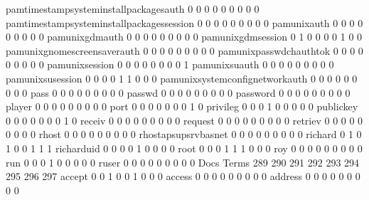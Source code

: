 \documentclass[compress,8pt]{beamer}
\begin{document}
\begin{frame}
\begin{Schunk}
  pamtimestampsysteminstallpackagesauth      0   0   0   0   0   0   0   0   0
  pamtimestampsysteminstallpackagessession   0   0   0   0   0   0   0   0   0
  pamunixauth                                0   0   0   0   0   0   0   0   0
  pamunixgdmauth                             0   0   0   0   0   0   0   0   0
  pamunixgdmsession                          0   1   0   0   0   0   1   0   0
  pamunixgnomescreensaverauth                0   0   0   0   0   0   0   0   0
  pamunixpasswdchauthtok                     0   0   0   0   0   0   0   0   0
  pamunixsession                             0   0   0   0   0   0   0   0   1
  pamunixsuauth                              0   0   0   0   0   0   0   0   0
  pamunixsusession                           0   0   0   0   1   1   0   0   0
  pamunixsystemconfignetworkauth             0   0   0   0   0   0   0   0   0
  pass                                       0   0   0   0   0   0   0   0   0
  passwd                                     0   0   0   0   0   0   0   0   0
  password                                   0   0   0   0   0   0   0   0   0
  player                                     0   0   0   0   0   0   0   0   0
  port                                       0   0   0   0   0   0   0   1   0
  privileg                                   0   0   0   1   0   0   0   0   0
  publickey                                  0   0   0   0   0   0   0   1   0
  receiv                                     0   0   0   0   0   0   0   0   0
  request                                    0   0   0   0   0   0   0   0   0
  retriev                                    0   0   0   0   0   0   0   0   0
  rhost                                      0   0   0   0   0   0   0   0   0
  rhostapsupsrvbasnet                        0   0   0   0   0   0   0   0   0
  richard                                    0   1   0   1   0   0   1   1   1
  richarduid                                 0   0   0   0   1   0   0   0   0
  root                                       0   0   0   1   1   1   0   0   0
  roy                                        0   0   0   0   0   0   0   0   0
  run                                        0   0   0   1   0   0   0   0   0
  ruser                                      0   0   0   0   0   0   0   0   0
                                          Docs
Terms                                      289 290 291 292 293 294 295 296 297
  accept                                     0   0   1   0   0   1   0   0   0
  access                                     0   0   0   0   0   0   0   0   0
  address                                    0   0   0   0   0   0   0   0   0

\end{Schunk}
\end{frame}
\end{document}
